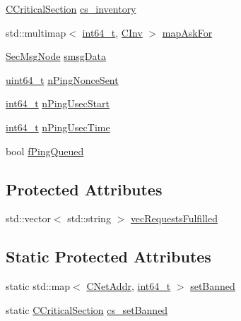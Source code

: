 \begin{DoxyCompactItemize}
\hyperlink{sync_8h_a37a4692b2d517f2843655ca11af7668a}{C\+Critical\+Section} \hyperlink{class_c_node_a1e8b0784cc82f33edc2dc4e2834d1ff0}{cs\+\_\+inventory}
\item 
std\+::multimap$<$ \hyperlink{stdint_8h_adec1df1b8b51cb32b77e5b86fff46471}{int64\+\_\+t}, \hyperlink{class_c_inv}{C\+Inv} $>$ \hyperlink{class_c_node_a7593dfbd76c34a81169e3fb2aa0e0cf7}{map\+Ask\+For}
\item 
\hyperlink{class_sec_msg_node}{Sec\+Msg\+Node} \hyperlink{class_c_node_a739eeb371b83583a159b0b9d386737b9}{smsg\+Data}
\item 
\hyperlink{stdint_8h_aaa5d1cd013383c889537491c3cfd9aad}{uint64\+\_\+t} \hyperlink{class_c_node_a9a077fbd09ddee1d81f027bc01a4ec68}{n\+Ping\+Nonce\+Sent}
\item 
\hyperlink{stdint_8h_adec1df1b8b51cb32b77e5b86fff46471}{int64\+\_\+t} \hyperlink{class_c_node_a8352aa332af726ff117fb890c4dd3869}{n\+Ping\+Usec\+Start}
\item 
\hyperlink{stdint_8h_adec1df1b8b51cb32b77e5b86fff46471}{int64\+\_\+t} \hyperlink{class_c_node_ada34ffe1700a5dafb57de7c4d2491844}{n\+Ping\+Usec\+Time}
\item 
bool \hyperlink{class_c_node_aa1e9c1dc1d5cf806b9be0af155c0bf90}{f\+Ping\+Queued}
\end{DoxyCompactItemize}
\subsection*{Protected Attributes}
\begin{DoxyCompactItemize}
\item 
std\+::vector$<$ std\+::string $>$ \hyperlink{class_c_node_a212cf268fdb1903f61993319175f023e}{vec\+Requests\+Fulfilled}
\end{DoxyCompactItemize}
\subsection*{Static Protected Attributes}
\begin{DoxyCompactItemize}
\item 
static std\+::map$<$ \hyperlink{class_c_net_addr}{C\+Net\+Addr}, \hyperlink{stdint_8h_adec1df1b8b51cb32b77e5b86fff46471}{int64\+\_\+t} $>$ \hyperlink{class_c_node_adf22d1873c1012ab3edb8a52253b203e}{set\+Banned}
\item 
static \hyperlink{sync_8h_a37a4692b2d517f2843655ca11af7668a}{C\+Critical\+Section} \hyperlink{class_c_node_a9ff9a6f07a280aa07d77713ae43d383a}{cs\+\_\+set\+Banned}
\end{DoxyCompactItemize}


